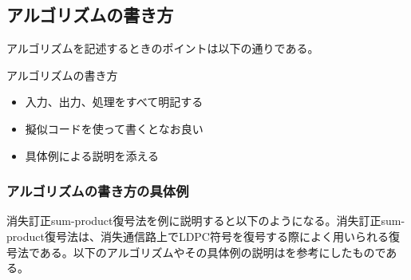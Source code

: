 \documentclass[a4j]{jsarticle}
\begin{document}
\subsection{アルゴリズムの書き方}
アルゴリズムを記述するときのポイントは以下の通りである。

\begin{itembox}[l]{アルゴリズムの書き方}
\begin{itemize}
\item 入力、出力、処理をすべて明記する
\item 擬似コードを使って書くとなお良い
\item 具体例による説明を添える
\end{itemize}
\end{itembox}

\subsubsection{アルゴリズムの書き方の具体例}

消失訂正sum-product復号法を例に説明すると以下のようになる。消失訂正sum-product復号法は、消失通信路上でLDPC符号を復号する際によく用いられる復号法である。以下のアルゴリズムやその具体例の説明は\cite{wadayama}を参考にしたものである。
\end{document}
